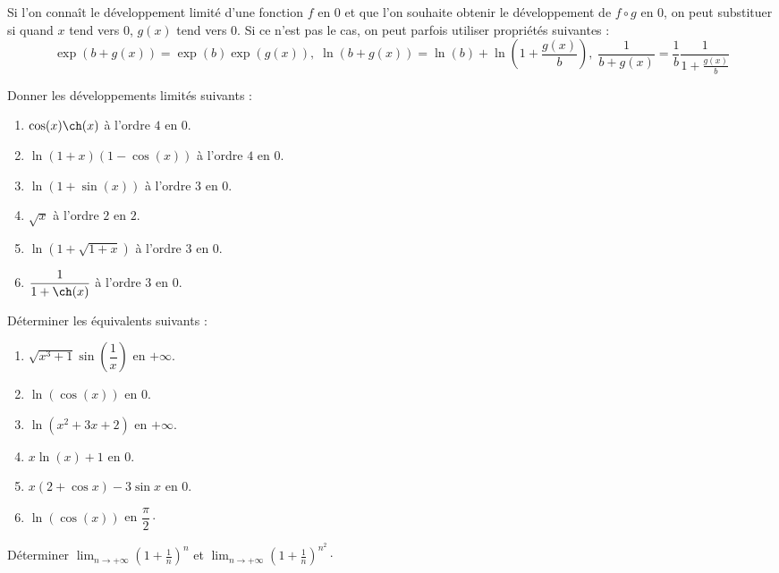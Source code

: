 \documentclass[a4paper,twoside,french,11pt]{VcCours}
\begin{document}
Si l'on connaît le développement limité d'une fonction $f$ en $0$ et que l'on souhaite obtenir le développement de $f \circ g$ en $0$, on peut substituer si quand $x$ tend vers $0$, $g(x)$ tend vers $0$. Si ce n'est pas le cas, on peut parfois utiliser propriétés suivantes :
$$ \exp(b+g(x)) = \exp(b) \exp(g(x)), \; \ln(b+g(x))= \ln(b)+ \ln \left( 1 + \frac{g(x)}{b} \right), \; \frac{1}{b+g(x)} = \frac{1}{b}\frac{1}{1+ \frac{g(x)}{b}}$$

\begin{Exercice}{}
  Donner les développements limités suivants : 

  \begin{multicols}{2}
    \begin{enumerate}
      \item $\cos(x) \ch(x)$ à l'ordre $4$ en $0$.
      \item $\ln(1+x)(1-\cos(x))$ à l'ordre $4$ en $0$.
      \item $\ln(1+ \sin(x))$ à l'ordre $3$ en $0$.
      \columnbreak
      \item $\sqrt{x}$ à l'ordre $2$ en $2$.
      \item $\ln(1 + \sqrt {1 + x})$ à l'ordre $3$ en $0$.
      \item $\dfrac{1}{1+\ch(x)}$ à l'ordre $3$ en $0$.
    \end{enumerate}
  \end{multicols}
\end{Exercice} 

\begin{Exercice}{}
  Déterminer les équivalents suivants :

  \begin{multicols}{2}
    \begin{enumerate}
      \item $\sqrt{x^3+1} \sin \left( \dfrac{1}{x}\right)$ en $+ \infty$.
      \item $\ln(\cos(x))$ en $0$.
      \item $\ln(x^2+3x+2)$ en $+ \infty$.
      \columnbreak
      \item $x\ln(x)+1$ en $0$.
      \item $x(2 + \cos x) - 3\sin x$ en $0$.
      \item $\ln( \cos(x))$ en $\dfrac{\pi}{2}\cdot$
    \end{enumerate}
  \end{multicols}
\end{Exercice} 

\begin{Exercice}{}
  Déterminer $\lim_{n \rightarrow + \infty} \left( 1+ \frac{1}{n} \right)^n$ et $\lim_{n \rightarrow + \infty} \left( 1+ \frac{1}{n} \right)^{n^2}\cdot$
\end{Exercice} 
\end{document}
